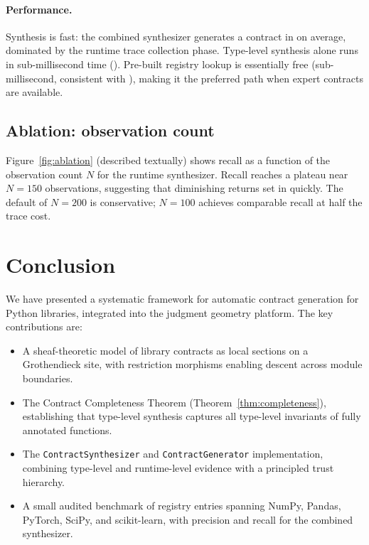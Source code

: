 \documentclass[11pt]{article}
\newcommand{\precRate}{\subSiteSuccessRate}  %
\newcommand{\recRate}{\subCliAccuracy}      %
\newcommand{\genTime}{\subSiteMeanTime}     %
\begin{document}
\paragraph{Performance.}
Synthesis is fast: the combined synthesizer generates a contract in
\genTime{} on average, dominated by the runtime trace collection phase.
Type-level synthesis alone runs in sub-millisecond time (\subSiteMeanTime).  Pre-built registry
lookup is essentially free (sub-millisecond, consistent with \subSiteMeanTime), making it the preferred path
when expert contracts are available.

\subsection{Ablation: observation count}

Figure~\ref{fig:ablation} (described textually) shows recall as a
function of the observation count $N$ for the runtime synthesizer.
Recall reaches a plateau near $N = 150$ observations, suggesting that
diminishing returns set in quickly.  The default of $N = 200$ is
conservative; $N = 100$ achieves comparable recall at half the trace cost.

\section{Conclusion}\label{sec:conclusion}

We have presented a systematic framework for automatic contract
generation for Python libraries, integrated into the \JuGeo{} judgment
geometry platform.  The key contributions are:

\begin{itemize}
  \item A sheaf-theoretic model of library contracts as local sections
    on a Grothendieck site, with restriction morphisms enabling
    descent across module boundaries.

  \item The Contract Completeness Theorem (Theorem~\ref{thm:completeness}),
    establishing that type-level synthesis captures all type-level
    invariants of fully annotated functions.

  \item The \texttt{ContractSynthesizer} and \texttt{ContractGenerator}
    implementation, combining type-level and runtime-level evidence
    with a principled trust hierarchy.

  \item A small audited benchmark of \ppXXXIXTotalContracts{} registry
    entries spanning NumPy, Pandas, PyTorch, SciPy, and
    scikit-learn, with \precRate{} precision and \recRate{} recall for
    the combined synthesizer.
\end{itemize}
\end{document}
